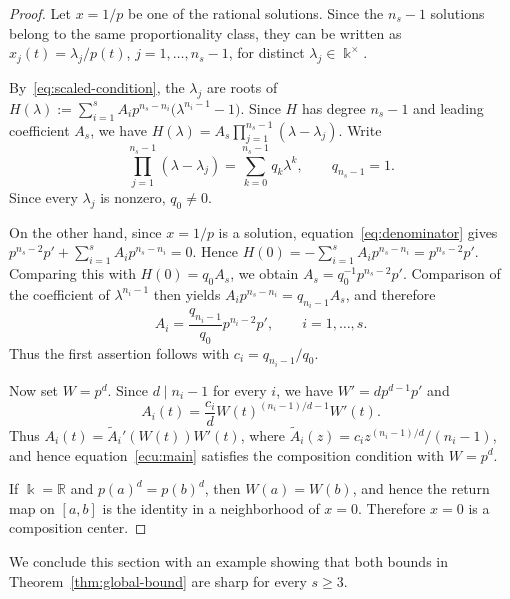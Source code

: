 \documentclass[12pt,a4paper]{amsart}
\numberwithin{theorem}{section}
\theoremstyle{definition}
\begin{document}
	\begin{proof}
		Let $x=1/p$ be one of the rational solutions. Since the $n_s-1$ solutions belong to the same proportionality class, they can be written as $x_j(t)=\lambda_j/p(t)$, $j=1,\ldots,n_s-1$, for distinct $\lambda_j\in\Bbbk^\times$.
		
		By~\eqref{eq:scaled-condition}, the $\lambda_j$ are roots of $
		H(\lambda):=\sum_{i=1}^s A_i p^{n_s-n_i}\bigl(\lambda^{n_i-1}-1\bigr)$. Since $H$ has degree $n_s-1$ and leading coefficient $A_s$, we have $H(\lambda)=A_s\prod_{j=1}^{n_s-1}(\lambda-\lambda_j)$. Write
		\[
		\prod_{j=1}^{n_s-1}(\lambda-\lambda_j)=\sum_{k=0}^{n_s-1}q_k\lambda^k,\qquad q_{n_s-1}=1.
		\]
		Since every $\lambda_j$ is nonzero, $q_0\neq0$.
		
		On the other hand, since $x=1/p$ is a solution, equation~\eqref{eq:denominator} gives $p^{n_s-2}p'+\sum_{i=1}^s A_i p^{n_s-n_i}=0$.
		Hence $H(0)=-\sum_{i=1}^s A_i p^{n_s-n_i}=p^{n_s-2}p'$. Comparing this with $H(0)=q_0A_s$, we obtain $A_s=q_0^{-1}p^{n_s-2}p'$. Comparison of the coefficient of $\lambda^{n_i-1}$ then yields $A_i p^{n_s-n_i}=q_{n_i-1}A_s$, and therefore
		\[
		A_i=\frac{q_{n_i-1}}{q_0}p^{n_i-2}p',\qquad i=1,\ldots,s.
		\]
		Thus the first assertion follows with $c_i=q_{n_i-1}/q_0$.
		
		Now set $W=p^d$. Since $d\mid n_i-1$ for every $i$, we have $W'=dp^{d-1}p'$ and
		\[
		A_i(t)=\frac{c_i}{d}W(t)^{(n_i-1)/d-1}W'(t).
		\]
		Thus $A_i(t)=\widetilde A_i'(W(t))W'(t)$, where $\widetilde A_i(z)=c_i z^{(n_i-1)/d}/(n_i-1)$, and hence equation~\eqref{ecu:main} satisfies the composition condition with $W=p^d$.
		
		If $\Bbbk=\mathbb{R}$ and $p(a)^d=p(b)^d$, then $W(a)=W(b)$, and hence the return map on $[a,b]$ is the identity in a neighborhood of $x=0$. Therefore $x=0$ is a composition center.
	\end{proof}
	
	We conclude this section with an example showing that both bounds in Theorem~\ref{thm:global-bound} are sharp for every $s\geq3$.
	
\end{document}
